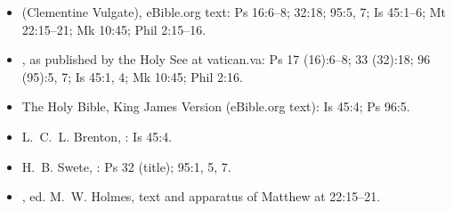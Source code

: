 {\begin{itemize}[itemsep=0pt,topsep=.25em]
\item {} (Clementine Vulgate), eBible.org text: Ps 16:6--8; 32:18; 95:5, 7; Is 45:1--6; Mt 22:15--21; Mk 10:45; Phil 2:15--16.
\item {}, as published by the Holy See at vatican.va: Ps 17 (16):6--8; 33 (32):18; 96 (95):5, 7; Is 45:1, 4; Mk 10:45; Phil 2:16.
\item The Holy Bible, King James Version (eBible.org text): Is 45:4; Ps 96:5.
\item L.~C.~L. Brenton, : Is 45:4.
\item H.~B. Swete, : Ps 32 (title); 95:1, 5, 7.
\item {}, ed. M.~W. Holmes, text and apparatus of Matthew at 22:15--21.
\end{itemize}

}
